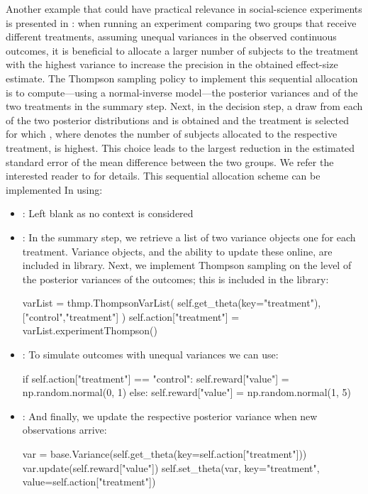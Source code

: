 \documentclass[nojss]{jss}
\begin{document}
Another example that could have practical relevance in social-science experiments is presented in \citet{Kaptein2014a}: when running an experiment comparing two groups that receive different treatments, assuming unequal variances in the observed continuous outcomes, it is beneficial to allocate a larger number of subjects to the treatment with the highest variance to increase the precision in the obtained effect-size estimate. The Thompson sampling policy to implement this sequential allocation is to compute---using a normal-inverse  model---the posterior variances  and  of the two treatments in the summary step. Next, in the decision step, a draw  from each of the two posterior distributions  and  is obtained and the treatment is selected for which , where  denotes the number of subjects allocated to the respective treatment, is highest. This choice leads to the largest reduction in the estimated standard error of the mean difference between the two groups. We refer the interested reader to \citet{Kaptein2014a} for details. This sequential allocation scheme can be implemented In  using:

\begin{itemize}
\item {}: Left blank as no context is considered
\item {}: In the summary step, we retrieve a list of two variance objects one for each treatment. Variance objects, and the ability to update these online, are included in  library. Next, we implement Thompson sampling on the level of the posterior variances of the outcomes; this is included in the  library:
\begin{Code}
varList = thmp.ThompsonVarList(
    self.get_theta(key="treatment"), ["control","treatment"]
    )
self.action["treatment"] = varList.experimentThompson()
\end{Code}
\item {}: To simulate outcomes with unequal variances we can use:
\begin{Code}
if self.action["treatment"] == "control":
    self.reward["value"] = np.random.normal(0, 1)
else:
    self.reward["value"] = np.random.normal(1, 5)
\end{Code}
\item {}: And finally, we update the respective posterior variance when new observations arrive:
\begin{Code}
var = base.Variance(self.get_theta(key=self.action["treatment"]))
var.update(self.reward["value"])
self.set_theta(var, key="treatment", value=self.action["treatment"])
\end{Code}
\end{itemize}
\end{document}
